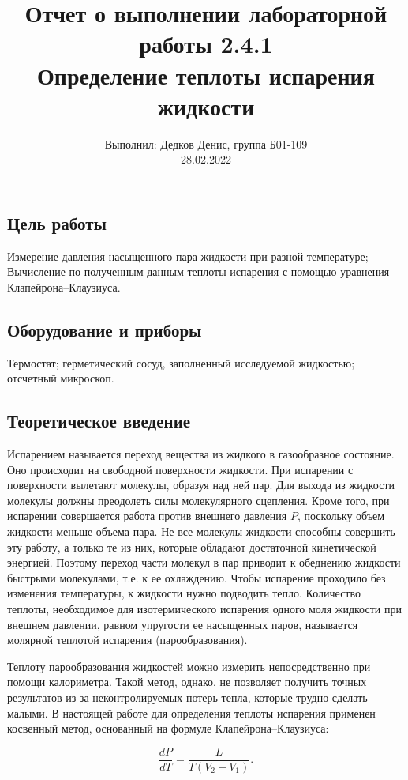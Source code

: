 \documentclass[12pt,a4paper]{article}
\author{\normalsize Выполнил: Дедков Денис, группа Б01-109 \\
	\normalsize 28.02.2022}
\date{}
\title{
	\large Отчет о выполнении лабораторной работы 2.4.1 \\
	\Large Определение теплоты испарения жидкости \\ 
	
}
\begin{document}
	\maketitle
	\subsection*{Цель работы} 
	 Измерение давления насыщенного пара жидкости при разной температуре;
	 Вычисление по полученным данным теплоты испарения с помощью уравнения Клапейрона–Клаузиуса.
	
	\subsection*{Оборудование и приборы} Термостат; герметический сосуд, заполненный исследуемой жидкостью; отсчетный микроскоп.
	
	
\subsection*{Теоретическое введение}

Испарением называется переход вещества из жидкого в газообразное состояние. Оно происходит на свободной поверхности жидкости. При испарении с поверхности вылетают молекулы, образуя над ней пар. Для выхода из жидкости молекулы должны преодолеть силы молекулярного сцепления. Кроме того, при испарении совершается работа против внешнего давления $ P $, поскольку объем жидкости меньше объема пара. Не все молекулы жидкости способны совершить эту работу, а только те из них, которые обладают достаточной кинетической энергией. Поэтому переход части молекул в пар приводит к обеднению жидкости быстрыми молекулами, т.е. к ее охлаждению. Чтобы испарение проходило без изменения температуры, к жидкости нужно подводить тепло. Количество теплоты, необходимое для изотермического испарения одного моля жидкости при внешнем давлении, равном упругости ее насыщенных паров, называется молярной теплотой испарения (парообразования).

Теплоту парообразования жидкостей можно измерить непосредственно при помощи калориметра. Такой метод, однако, не позволяет получить точных результатов из-за неконтролируемых потерь тепла, которые трудно сделать малыми. В настоящей работе для определения теплоты испарения применен косвенный метод, основанный на формуле Клапейрона–Клаузиуса:

\begin{equation}\label{Kl-Kl}
	\frac{dP}{dT}=\frac{L}{T\left(V_2-V_1\right)}.
\end{equation}
\end{document}
